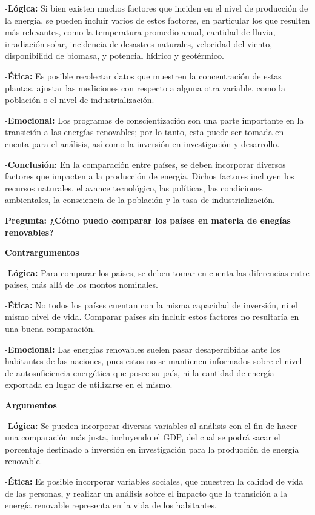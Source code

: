 \documentclass[
  letterpaper,
  DIV=11,
  numbers=noendperiod]{scrreprt}
\begin{document}
-\textbf{Lógica:} Si bien existen muchos factores que inciden en el
nivel de producción de la energía, se pueden incluir varios de estos
factores, en particular los que resulten más relevantes, como la
temperatura promedio anual, cantidad de lluvia, irradiación solar,
incidencia de desastres naturales, velocidad del viento, disponibilidd
de biomasa, y potencial hídrico y geotérmico.

-\textbf{Ética:} Es posible recolectar datos que muestren la
concentración de estas plantas, ajustar las mediciones con respecto a
alguna otra variable, como la población o el nivel de industrialización.

-\textbf{Emocional:} Los programas de conscientización son una parte
importante en la transición a las energías renovables; por lo tanto,
esta puede ser tomada en cuenta para el análisis, así como la inversión
en investigación y desarrollo.

-\textbf{Conclusión:} En la comparación entre países, se deben
incorporar diversos factores que impacten a la producción de energía.
Dichos factores incluyen los recursos naturales, el avance tecnológico,
las políticas, las condiciones ambientales, la consciencia de la
población y la tasa de industrialización.

\textbf{Pregunta: ¿Cómo puedo comparar los países en materia de enegías
renovables?}

\textbf{Contrargumentos}

-\textbf{Lógica:} Para comparar los países, se deben tomar en cuenta las
diferencias entre países, más allá de los montos nominales.

-\textbf{Ética:} No todos los países cuentan con la misma capacidad de
inversión, ni el mismo nivel de vida. Comparar países sin incluir estos
factores no resultaría en una buena comparación.

-\textbf{Emocional:} Las energías renovables suelen pasar desapercibidas
ante los habitantes de las naciones, pues estos no se mantienen
informados sobre el nivel de autosuficiencia energética que posee su
país, ni la cantidad de energía exportada en lugar de utilizarse en el
mismo.

\textbf{Argumentos}

-\textbf{Lógica:} Se pueden incorporar diversas variables al análisis
con el fin de hacer una comparación más justa, incluyendo el GDP, del
cual se podrá sacar el porcentaje destinado a inversión en investigación
para la producción de energía renovable.

-\textbf{Ética:} Es posible incorporar variables sociales, que muestren
la calidad de vida de las personas, y realizar un análisis sobre el
impacto que la transición a la energía renovable representa en la vida
de los habitantes.
\end{document}
